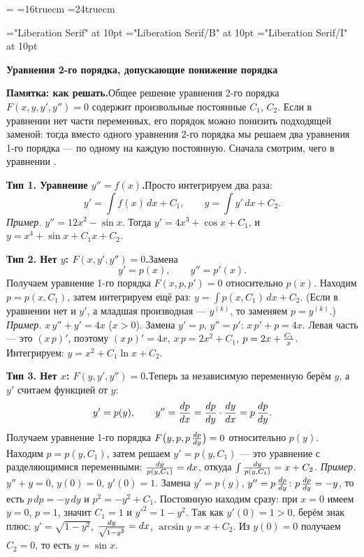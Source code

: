 \magnification=
\hsize=16truecm
\vsize=24truecm
\parindent=0pt
\baselineskip=14pt
\raggedright
{}

\font\tenrm="Liberation Serif" at 10pt
\font\tenbf="Liberation Serif/B" at 10pt
\font\tenit="Liberation Serif/I" at 10pt
\rm

\def\boxnum#1{\hbox{\vrule\vbox{\hrule\hbox{\strut\kern5pt{\bf#1}\kern5pt}\hrule}\vrule}}

\def\problem#1#2{\vskip0pt plus 60pt\penalty-400\bigskip
  \line{\boxnum{#1}\quad #2\hfil}\nobreak\smallskip}
\def\st#1{\medskip\noindent{\bf #1}\enspace\ignorespaces}
\def\ans#1{\medskip\noindent\hbox{\vrule\vbox{\hrule\hbox{\strut\kern5pt{\bf Ответ:}\enspace$\displaystyle #1$\kern5pt}\hrule}\vrule}\par}

\centerline{\bf Уравнения 2-го порядка, допускающие понижение порядка}
\bigskip

{\bf Памятка: как решать.}\quad Общее решение уравнения 2-го порядка
$F(x,y,y',y'')=0$ содержит  произвольные постоянные $C_1$, $C_2$.
Если в уравнении нет части переменных, его порядок можно понизить подходящей
заменой: тогда вместо одного уравнения 2-го порядка мы решаем два уравнения
1-го порядка --- по одному на каждую постоянную. Сначала смотрим, чего в
уравнении .
\medskip

{\bf Тип 1. Уравнение $y''=f(x)$.}\quad Просто интегрируем два раза:
$$y'=\int f(x)\,dx+C_1,\qquad y=\int y'\,dx+C_2.$$
{\it Пример.} $y''=12x^2-\sin x$. Тогда $y'=4x^3+\cos x+C_1$, и
$y=x^4+\sin x+C_1x+C_2$.
\medskip

{\bf Тип 2. Нет $y$: $F(x,y',y'')=0$.}\quad Замена
$$y'=p(x),\qquad y''=p'(x).$$
Получаем уравнение 1-го порядка $F(x,p,p')=0$ относительно $p(x)$. Находим
$p=p(x,C_1)$, затем интегрируем ещё раз: $y=\int p(x,C_1)\,dx+C_2$.
(Если в уравнении нет и $y'$, а младшая производная --- $y^{(k)}$, то
заменяем $p=y^{(k)}$.)
\smallskip
{\it Пример.} $x\,y''+y'=4x$ ($x>0$). Замена $y'=p$, $y''=p'$:
$x\,p'+p=4x$. Левая часть --- это $(x\,p)'$, поэтому $(x\,p)'=4x$,
$x\,p=2x^2+C_1$, $p=2x+{C_1\over x}$. Интегрируем:
$y=x^2+C_1\ln x+C_2$.
\medskip

{\bf Тип 3. Нет $x$: $F(y,y',y'')=0$.}\quad Теперь за независимую
переменную берём $y$, а $y'$ считаем функцией от $y$:
$$y'=p(y),\qquad y''={dp\over dx}={dp\over dy}\cdot{dy\over dx}
=p\,{dp\over dy}.$$
Получаем уравнение 1-го порядка $F\bigl(y,p,p\,{dp\over dy}\bigr)=0$ относительно
$p(y)$. Находим $p=p(y,C_1)$, затем решаем $y'=p(y,C_1)$ --- это уравнение
с разделяющимися переменными: ${dy\over p(y,C_1)}=dx$, откуда
$\int{dy\over p(y,C_1)}=x+C_2$.
\smallskip
{\it Пример.} $y''+y=0$, $y(0)=0$, $y'(0)=1$. Замена $y'=p(y)$,
$y''=p\,{dp\over dy}$: $p\,{dp\over dy}=-y$, то есть $p\,dp=-y\,dy$ и
$p^2=-y^2+C_1$. Постоянную находим сразу: при $x=0$ имеем $y=0$,
$p=1$, значит $C_1=1$ и $y'^2=1-y^2$. Так как $y'(0)=1>0$, берём знак
плюс: $y'=\sqrt{1-y^2}$, ${dy\over\sqrt{1-y^2}}=dx$,
$\arcsin y=x+C_2$. Из $y(0)=0$ получаем $C_2=0$, то есть $y=\sin x$.
\medskip

